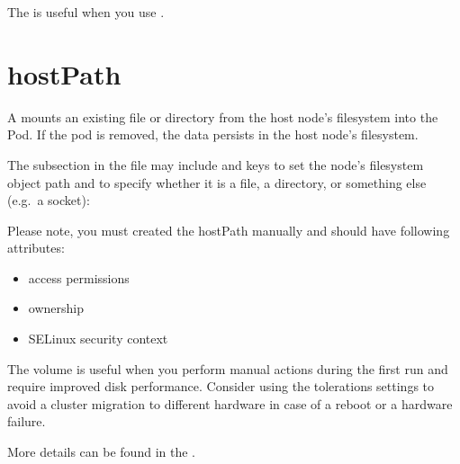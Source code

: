 \documentclass[letterpaper,10pt,english]{sphinxmanual}
\begin{document}
The  is useful when you use .


\section{hostPath}
\label{\detokenize{storage:hostpath}}
A 
mounts an existing file or directory from the host node’s filesystem into
the Pod. If the pod is removed, the data persists in the host node’s filesystem.

The  subsection in the
file may include  and  keys to set the node’s filesystem
object path and to specify whether it is a file, a directory, or
something else (e.g. a socket):

\begin{sphinxVerbatim}[commandchars=\\\{\}]
     
     
\end{sphinxVerbatim}

Please note, you must created the hostPath manually and should have following
attributes:
\begin{itemize}
\item {} 
access permissions

\item {} 
ownership

\item {} 
SELinux security context

\end{itemize}

The  volume is useful when you perform manual actions
during the first run and require improved disk performance.
Consider using the tolerations settings to avoid a cluster migration to
different hardware in case of a reboot or a hardware failure.

More details can be found in the .
\end{document}
